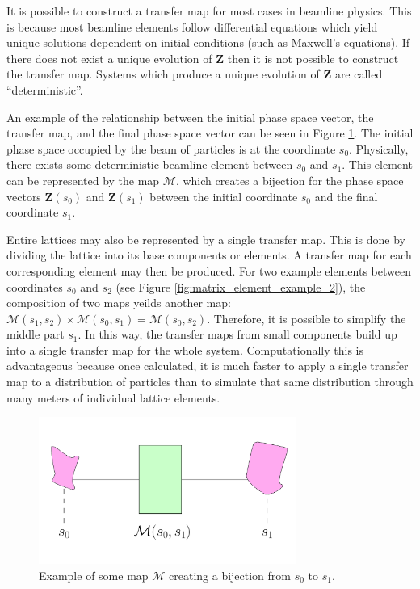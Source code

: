 It is possible to construct a transfer map for most cases in beamline physics. This is because most beamline elements follow differential equations which yield unique solutions dependent on initial conditions (such as Maxwell's equations). If there does not exist a unique evolution of $\mathbf{Z}$ then it is not possible to construct the transfer map. Systems which produce a unique evolution of $\mathbf{Z}$ are called ``deterministic''.

An example of the relationship between the initial phase space vector, the transfer map, and the final phase space vector can be seen in Figure \ref{fig:matrix_element_example_1}. The initial phase space occupied by the beam of particles is at the coordinate $s_0$. Physically, there exists some deterministic beamline element between $s_0$ and $s_1$. This element can be represented by the map $\mathcal{M}$, which creates a bijection for the phase space vectors $\mathbf{Z}(s_0)$ and $\mathbf{Z}(s_1)$ between the initial coordinate $s_0$ and the final coordinate $s_1$. 

Entire lattices may also be represented by a single transfer map. This is done by dividing the lattice into its base components or elements. A transfer map for each corresponding element may then be produced. For two example elements between coordinates $s_0$ and $s_2$ (see Figure \ref{fig:matrix_element_example_2}), the composition of two maps yeilds another map: $\mathcal{M}(s_1 , s_2)\times \mathcal{M}(s_0 , s_1) = \mathcal{M}(s_0 , s_2)$.  Therefore, it is possible to simplify the middle part $s_1$. In this way, the transfer maps from small components build up into a single transfer map for the whole system. Computationally this is advantageous because once calculated, it is much faster to apply a single transfer map to a distribution of particles than to simulate that same distribution through many meters of individual lattice elements.

\begin{figure}[h!]
  \centering
    \includegraphics[width=0.75\textwidth]{Figures/matrix_element_example_1} 
  \caption{Example of some map $\mathcal{M}$ creating a bijection from $s_0$ to $s_1$.}
  \label{fig:matrix_element_example_1}
\end{figure}

